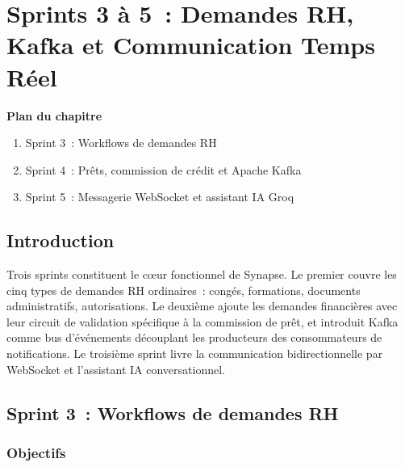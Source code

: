 \chapter{Sprints 3 à 5~: Demandes RH, Kafka et Communication Temps Réel}

\noindent\textbf{Plan du chapitre}
\begin{enumerate}[nosep]
  \item Sprint 3~: Workflows de demandes RH
  \item Sprint 4~: Prêts, commission de crédit et Apache Kafka
  \item Sprint 5~: Messagerie WebSocket et assistant IA Groq
\end{enumerate}

\section{Introduction}

Trois sprints constituent le c\oe{}ur fonctionnel de Synapse. Le premier couvre
les cinq types de demandes RH ordinaires~: congés, formations, documents
administratifs, autorisations. Le deuxième ajoute les demandes financières avec
leur circuit de validation spécifique à la commission de prêt, et introduit Kafka
comme bus d'événements découplant les producteurs des consommateurs de
notifications. Le troisième sprint livre la communication bidirectionnelle par
WebSocket et l'assistant IA conversationnel.

\section{Sprint 3~: Workflows de demandes RH}

\subsection{Objectifs}

